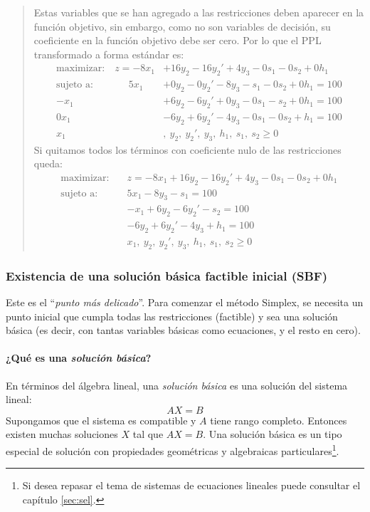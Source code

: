 \begin{quote}
  Estas variables que se han agregado a las restricciones deben aparecer en la función objetivo, sin embargo, como no son variables de decisión, su coeficiente en la función objetivo debe ser cero. Por lo que el PPL transformado a forma estándar es:
  \begin{align*}
    \text{maximizar:} \quad   z = -8x_1& + 16y_2 - 16y_2' + 4y_3 - 0s_1 - 0s_2 + 0h_1 \\[3pt]
    \text{sujeto a: } ~\qquad\quad   5x_1& + 0y_2 - 0y_2' - 8y_3 - s_1 - 0s_2 + 0h_1 = 100 \\
                              -x_1& + 6y_2 - 6y_2' + 0y_3 - 0s_1 - s_2 + 0h_1 = 100 \\
                              0x_1& -6y_2 + 6y_2' - 4y_3 - 0s_1 - 0s_2 + h_1 = 100 \\
                              x_1&,\ y_2,\ y_2',\ y_3,\ h_1,\ s_1,\ s_2 \geq 0
  \end{align*}
  Si quitamos todos los términos con coeficiente nulo de las restricciones queda:
  \begin{align*}
    \text{maximizar:} \quad   &z = -8x_1 + 16y_2 - 16y_2' + 4y_3 - 0s_1 - 0s_2 + 0h_1 \\[3pt]
    \text{sujeto a:} \quad    &5x_1 - 8y_3 - s_1 = 100 \\
                              &-x_1 + 6y_2 - 6y_2' - s_2 = 100 \\
                              &-6y_2 + 6y_2' - 4y_3 + h_1 = 100 \\
                              &x_1,\ y_2,\ y_2',\ y_3,\ h_1,\ s_1,\ s_2 \geq 0
  \end{align*}
\end{quote}

\subsubsection{Existencia de una solución básica factible inicial (SBF)}

Este es el ``\textit{punto más delicado}''. Para comenzar el método Simplex, se necesita un punto inicial que cumpla todas las restricciones (factible) y sea una solución básica (es decir, con tantas variables básicas como ecuaciones, y el resto en cero).

\paragraph{¿Qué es una \textit{solución básica}?}

En términos del álgebra lineal, una \textit{solución básica} es una solución del sistema lineal:
\[
AX = B
\]
Supongamos que el sistema es compatible y \(A\) tiene rango completo. Entonces existen muchas soluciones \(X\) tal que \(AX=B\). Una solución básica es un tipo especial de solución con propiedades geométricas y algebraicas particulares\footnote{Si desea repasar el tema de sistemas de ecuaciones lineales puede consultar el capítulo \ref{sec:sel}.}. 

